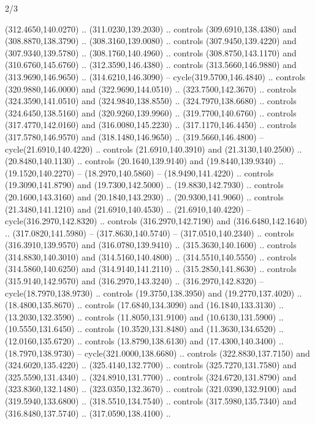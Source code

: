 \begin{flagdescription}{2/3}
\begin{scope}[xshift=0.5\flaglength,yshift=0.5\flagwidth,scale=\stretchfactor]
\begin{scope}[scale=0.001645\flagwidth,yshift=65mm,xshift=-63mm]
\begin{scope}[y=0.80pt, x=0.80pt, yscale=-1,]
\begin{scope}[cm={{1.33333,0.0,0.0,1.33333,(0.0,1e-05)}}]
  (312.4650,140.0270) .. (311.0230,139.2030) .. controls (309.6910,138.4380) and
  (308.8870,138.3790) .. (308.3160,139.0080) .. controls (307.9450,139.4220) and
  (307.9340,139.5780) .. (308.1760,140.4960) .. controls (308.8750,143.1170) and
  (310.6760,145.6760) .. (312.3590,146.4380) .. controls (313.5660,146.9880) and
  (313.9690,146.9650) .. (314.6210,146.3090) -- cycle(319.5700,146.4840) ..
  controls (320.9880,146.0000) and (322.9690,144.0510) .. (323.7500,142.3670) ..
  controls (324.3590,141.0510) and (324.9840,138.8550) .. (324.7970,138.6680) ..
  controls (324.6450,138.5160) and (320.9260,139.9960) .. (319.7700,140.6760) ..
  controls (317.4770,142.0160) and (316.0080,145.2230) .. (317.1170,146.4450) ..
  controls (317.5780,146.9570) and (318.1480,146.9650) .. (319.5660,146.4800) --
  cycle(21.6910,140.4220) .. controls (21.6910,140.3910) and (21.3130,140.2500)
  .. (20.8480,140.1130) .. controls (20.1640,139.9140) and (19.8440,139.9340) ..
  (19.1520,140.2270) -- (18.2970,140.5860) -- (18.9490,141.4220) .. controls
  (19.3090,141.8790) and (19.7300,142.5000) .. (19.8830,142.7930) .. controls
  (20.1600,143.3160) and (20.1840,143.2930) .. (20.9300,141.9060) .. controls
  (21.3480,141.1210) and (21.6910,140.4530) .. (21.6910,140.4220) --
  cycle(316.2970,142.8320) .. controls (316.2970,142.7190) and
  (316.6480,142.1640) .. (317.0820,141.5980) -- (317.8630,140.5740) --
  (317.0510,140.2340) .. controls (316.3910,139.9570) and (316.0780,139.9410) ..
  (315.3630,140.1600) .. controls (314.8830,140.3010) and (314.5160,140.4800) ..
  (314.5510,140.5550) .. controls (314.5860,140.6250) and (314.9140,141.2110) ..
  (315.2850,141.8630) .. controls (315.9140,142.9570) and (316.2970,143.3240) ..
  (316.2970,142.8320) -- cycle(18.7970,138.9730) .. controls (19.3750,138.3950)
  and (19.2770,137.4020) .. (18.4800,135.8670) .. controls (17.6840,134.3090)
  and (16.1840,133.3130) .. (13.2030,132.3590) .. controls (11.8050,131.9100)
  and (10.6130,131.5900) .. (10.5550,131.6450) .. controls (10.3520,131.8480)
  and (11.3630,134.6520) .. (12.0160,135.6720) .. controls (13.8790,138.6130)
  and (17.4300,140.3400) .. (18.7970,138.9730) -- cycle(321.0000,138.6680) ..
  controls (322.8830,137.7150) and (324.6020,135.4220) .. (325.4140,132.7700) ..
  controls (325.7270,131.7580) and (325.5590,131.4340) .. (324.8910,131.7700) ..
  controls (324.6720,131.8790) and (323.8360,132.1480) .. (323.0350,132.3670) ..
  controls (321.0390,132.9100) and (319.5940,133.6800) .. (318.5510,134.7540) ..
  controls (317.5980,135.7340) and (316.8480,137.5740) .. (317.0590,138.4100) ..

\end{scope}
\end{scope}
\end{scope}
\end{scope}
\end{flagdescription}

